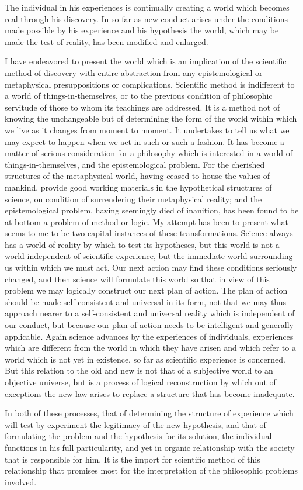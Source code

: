 \documentclass[12pt]{article}
\begin{document}
The individual in his experiences is continually creating
a world which becomes real through his discovery.
In so far as new conduct arises under the
conditions made possible by his experience and his hypothesis
the world, which may be made the test of
reality, has been modified and enlarged.


I have endeavored to present the world which is an
implication of the scientific method of discovery with
entire abstraction from any epistemological or metaphysical
presuppositions or complications. Scientific
method is indifferent to a world of things-in-themselves,
or to the previous condition of philosophic servitude of
those to whom its teachings are addressed. It is a
method not of knowing the unchangeable but of determining
the form of the world within which we live as
it changes from moment to moment. It undertakes to
tell us what we may expect to happen when we act in
such or such a fashion. It has become a matter of
serious consideration for a philosophy which is interested
in a world of things-in-themselves, and the epistemological
problem. For the cherished structures of
the metaphysical world, having ceased to house the
values of mankind, provide good working materials in
the hypothetical structures of science, on condition of
surrendering their metaphysical reality; and the epistemological
problem, having seemingly died of inanition,
has been found to be at bottom a problem of method
or logic. My attempt has been to present what seems
to me to be two capital instances of these transformations.
Science always has a world of reality by which
to test its hypotheses, but this world is not a world
independent of scientific experience, but the immediate
world surrounding us within which we must act. Our
next action may find these conditions seriously changed,
and then science will formulate this world so that in
view of this problem we may logically construct our
next plan of action. The plan of action should be
made self-consistent and universal in its form, not that
we may thus approach nearer to a self-consistent and
universal reality which is independent of our conduct,
but because our plan of action needs to be intelligent
and generally applicable. Again science advances by
the experiences of individuals, experiences which are
different from the world in which they have arisen
and which refer to a world which is not yet in existence,
so far as scientific experience is concerned. But this
relation to the old and new is not that of a subjective
world to an objective universe, but is a process of
logical reconstruction by which out of exceptions the
new law arises to replace a structure that has become
inadequate.


In both of these processes, that of determining the
structure of experience which will test by experiment
the legitimacy of the new hypothesis, and that of formulating
the problem and the hypothesis for its solution,
the individual functions in his full particularity,
and yet in organic relationship with the society that
is responsible for him. It is the import for scientific
method of this relationship that promises most for the
interpretation of the philosophic problems involved.
\end{document}
